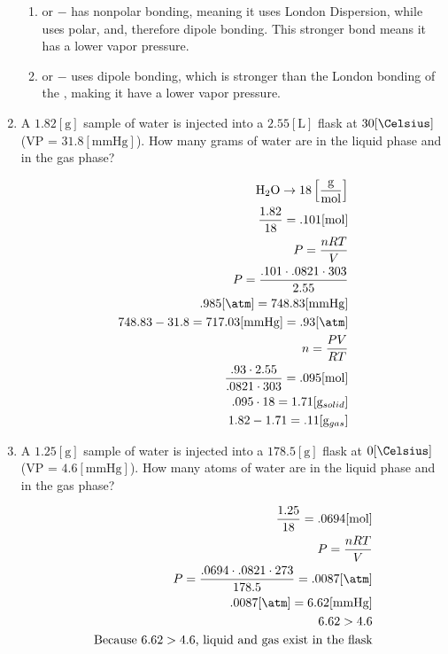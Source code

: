 \documentclass[12pt]{article}
\begin{document}
\begin{enumerate}
\begin{enumerate}
      \item {} or \underline{} $-$  has nonpolar bonding, meaning it uses London Dispersion, while  uses polar, and, therefore dipole bonding. This stronger bond means it has a lower vapor pressure.

      \item \underline{} or  $-$  uses dipole bonding, which is stronger than the London bonding of the , making it have a lower vapor pressure.

    \end{enumerate}

  \item A $1.82[\si{\gram}]$ sample of water is injected into a $2.55[\si{\liter}]$ flask at $30[\si{\Celsius}]$ (VP = $31.8[\si{\mmHg}]$).  How many grams of water are in the liquid phase and in the gas phase? 

    \begin{equation}
      \begin{split}
        \ce{H2O}\rightarrow 18\left[ \frac{\si{\gram}}{\si{\mole}} \right]\\
        \frac{1.82}{18}=.101[\si{\mole}]\\
        P=\frac{nRT}{V}\\
        P=\frac{.101\cdot.0821\cdot303}{2.55}\\
        .985[\si{\atm}]=748.83[\si{\mmHg}]\\
        748.83-31.8=717.03[\si{\mmHg}]=.93[\si{\atm}]\\
        n=\frac{PV}{RT}\\
        \frac{.93\cdot2.55}{.0821\cdot303}=.095[\si{\mole}]\\
        .095\cdot18=1.71[\si{\gram}_{solid}]\\
        1.82-1.71=.11[\si{\gram}_{gas}]\\
      \end{split}
      \label{1}
    \end{equation}

  \item A $1.25[\si{\gram}]$ sample of water is injected into a $178.5[\si{\gram}]$ flask at $0[\si{\Celsius}]$ (VP = $4.6[\si{\mmHg}]$). How many atoms of water are in the liquid phase and in the gas phase?

    \begin{equation}
      \begin{split}
        \frac{1.25}{18}=.0694[\si{\mole}]\\
        P=\frac{nRT}{V}\\
        P=\frac{.0694\cdot.0821\cdot273}{178.5}=.0087[\si{\atm}]\\
        .0087[\si{\atm}]=6.62[\si{\mmHg}]\\
        6.62>4.6\\
        \text{Because $6.62>4.6$, liquid and gas exist in the flask}
      \end{split}
      \label{2}
    \end{equation}

\end{enumerate}
\end{document}
